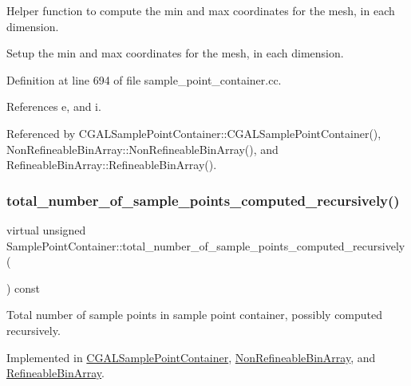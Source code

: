 Helper function to compute the min and max coordinates for the mesh, in each dimension. 

Setup the min and max coordinates for the mesh, in each dimension. 

Definition at line 694 of file sample\+\_\+point\+\_\+container.\+cc.



References e, and i.



Referenced by C\+G\+A\+L\+Sample\+Point\+Container\+::\+C\+G\+A\+L\+Sample\+Point\+Container(), Non\+Refineable\+Bin\+Array\+::\+Non\+Refineable\+Bin\+Array(), and Refineable\+Bin\+Array\+::\+Refineable\+Bin\+Array().

\mbox{\label{classSamplePointContainer_ac7bf51a6987a9180c7715d6211fdbb46}} 
\subsubsection{\texorpdfstring{total\+\_\+number\+\_\+of\+\_\+sample\+\_\+points\+\_\+computed\+\_\+recursively()}{total\_number\_of\_sample\_points\_computed\_recursively()}}
{\footnotesize\ttfamily virtual unsigned Sample\+Point\+Container\+::total\+\_\+number\+\_\+of\+\_\+sample\+\_\+points\+\_\+computed\+\_\+recursively (\begin{DoxyParamCaption}{ }\end{DoxyParamCaption}) const\hspace{0.3cm}{\ttfamily [pure virtual]}}



Total number of sample points in sample point container, possibly computed recursively. 



Implemented in \hyperlink{classCGALSamplePointContainer_ae6d735524cdc0af760e1f096eb12f6c1}{C\+G\+A\+L\+Sample\+Point\+Container}, \hyperlink{classNonRefineableBinArray_a937a83d5482e159270b498b4b15a1e48}{Non\+Refineable\+Bin\+Array}, and \hyperlink{classRefineableBinArray_a267d58bd06dafc53aff7b42927500a8b}{Refineable\+Bin\+Array}.

